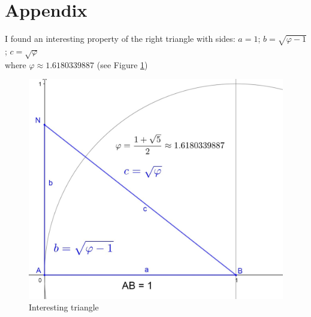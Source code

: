 \documentclass[12pt, letterpaper, oneside]{report}
\begin{document}
\newpage

\section{Appendix}

I found an interesting property of the right triangle with sides: $a=1$; $b=\sqrt{\varphi-1}$; $c=\sqrt{\varphi}$\\
where $\varphi\approx 1.6180339887$ (see Figure \ref{fig:mytriangle})
\begin{figure}[h]
	\centering
	\includegraphics[width=0.7\linewidth]{my_triangle.jpg}
	\caption{Interesting triangle}
	\label{fig:mytriangle}
\end{figure}
\end{document}
